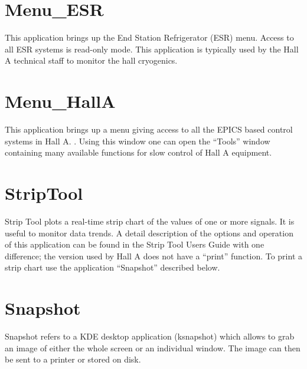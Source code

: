 {{\section{Menu\_ESR}
This application brings up the End Station
Refrigerator (ESR) menu. Access to all ESR systems is read-only mode. This application
is typically used by the Hall A technical staff to
monitor the hall cryogenics.


\section{Menu\_HallA}
\label{sec:contr-ha-menu}
This application brings up a menu giving access to all the EPICS 
based control systems in Hall A.
.
Using this window one can open the ``Tools'' window%
 containing
many available functions for slow control of Hall A equipment.

\section{StripTool}
Strip Tool plots a real-time strip chart of the values of one or more signals.
It is useful to monitor data trends.
A detail description of the options and operation
of this application can be found in the Strip Tool Users
Guide
with one difference; the version used by Hall A does not have a ``print'' function.
To print a strip chart use the application ``Snapshot'' described below.

\section{Snapshot}
Snapshot refers to a KDE desktop application (ksnapshot) which allows to grab an image
of either the whole
screen or an individual window. The image can then be sent to a printer or stored on disk.

}}
